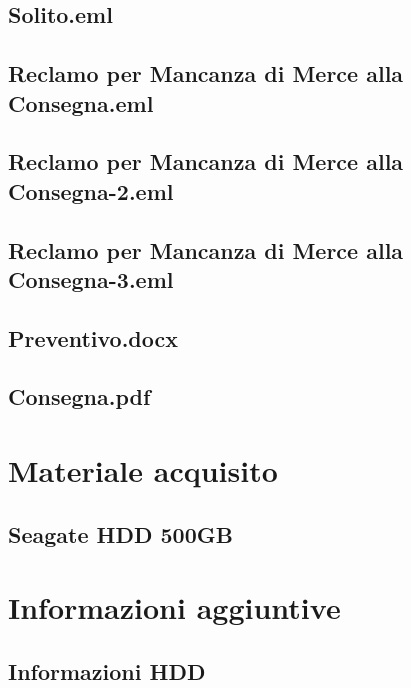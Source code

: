 \documentclass[a4paper,12pt]{report}
\begin{document}
\subsection{Solito.eml}
\vspace{5pt}


\subsection{Reclamo per Mancanza di Merce alla Consegna.eml}
\vspace{5pt}


\subsection{Reclamo per Mancanza di Merce alla Consegna-2.eml}
\vspace{5pt}


\subsection{Reclamo per Mancanza di Merce alla Consegna-3.eml}
\vspace{5pt}


\subsection{Preventivo.docx}
\vspace{5pt}


\subsection{Consegna.pdf}
\vspace{5pt}


\pagebreak

\section{Materiale acquisito}
\subsection{Seagate HDD 500GB}


\section{Informazioni aggiuntive}
\subsection{Informazioni HDD}
\end{document}
